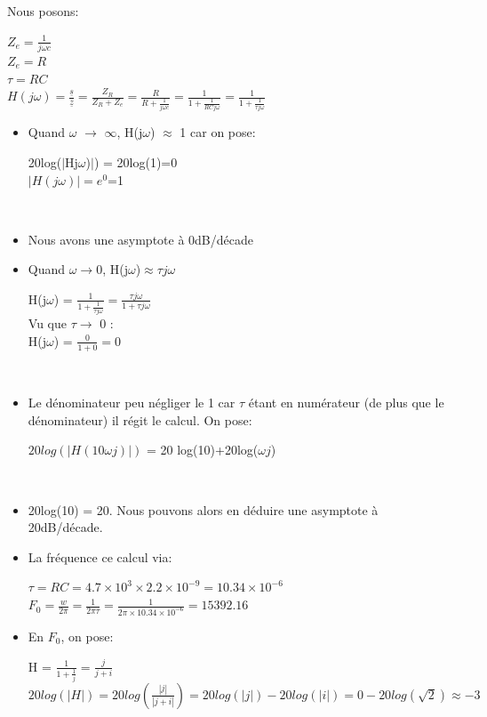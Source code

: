 \documentclass[a4paper,12pt,titlepage]{article}
\begin{document}
Nous posons: 

\begin{center}
    $Z_e = \frac{1}{j\omega c}$\\
    $Z_e = R$\\
    $\tau = RC$\\
    $H(j\omega) = \frac{\underline{s}}{\underline{z}} = \frac{Z_R}{Z_R+Z_e} = \frac{R}{R+\frac{1}{j\omega c}} = \frac{1}{1+\frac{1}{RCj\omega}} =  \frac{1}{1+\frac{1}{\tau j\omega}}$
\end{center}

\begin{itemize}
    \item Quand $\omega$  $\to$ $\infty$, H(j$\omega$) $\approx$ 1 car on pose:
    \begin{center}
        20log($|$Hj$\omega$)$|$) = 20log(1)=0\\
        
        $|H(j\omega)| = e^0$=1\\
    \end{center}\\
    \item Nous avons une asymptote à 0dB/décade\\
    \item Quand $\omega \to 0$, H(j$\omega$)$\approx \tau j\omega$\\
    \begin{center}
        H(j$\omega$) = $\frac{1}{1+\frac{1}{\tau j \omega}} = \frac{\tau j\omega}{1+\tau j \omega} $\\
        Vu que $\tau \to$ 0 :\\
        H(j$\omega$) = $\frac{0}{1+0}=0$
    \end{center}\\
    \item Le dénominateur peu négliger le 1 car $\tau$ étant en numérateur (de plus que le dénominateur) il régit le calcul. On pose:
    \begin{center}
        $20log(|H(10\omega j)|)$ = 20 log(10)+20log($\omega j$)
    \end{center}\\
    \item 20log(10) = 20. Nous pouvons alors en déduire une asymptote à 20dB/décade.
    \item La fréquence ce calcul via: 
    \begin{center}
        $\tau = RC = 4.7\times10^3\times2.2\times10^{-9} = 10.34\times10^{-6}$\\
        $F_0 = \frac{w}{2\pi} = \frac{1}{2\pi\tau} = \frac{1}{2\pi\times10.34\times10^{-6}} = 15392.16$\\
    \end{center}
    \item En $F_0$, on pose: 
    \begin{center}
        H = $\frac{1}{1+\frac{1}{j}} = \frac{j}{j+i}$\\
        $20log(|H|) = 20log(\frac{|j|}{|j+i|}) = 20log(|j|)-20log(|i|) = 0-20log(\sqrt{2}) \approx -3$
    \end{center}
\end{itemize}
\end{document}
